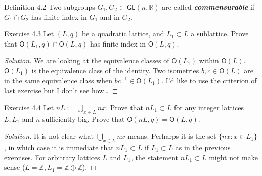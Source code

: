 \begin{idea7}{Definition 4.2}\leavevmode
	Two subgroups $G_1,G_2\subset \mathsf{GL}(n,\mathbb{R})$ are called \textit{\textbf{commensurable}} if $G_1\cap G_2$ has finite index in $G_1$ and in $G_2$.
\end{idea7}


\begin{idea8}{Exercise 4.3}\leavevmode
	Let $(L,q)$ be a quadratic lattice, and $L_1\subset L$ a sublattice. Prove that $\mathsf{O}(L_1,q) \cap \mathsf{O}(L,q)$ has finite index in $\mathsf{O}(L,q)$.
\end{idea8}

\begin{proof}[Solution]


	We are looking at the equivalence classes of $\mathsf{O}(L_1)$ within $\mathsf{O}(L)$. $\mathsf{O}(L_1)$ is the equivalence class of the identity. Two isometries $b,c\in\mathsf{O}(L)$ are in the same equivalence class when $bc^{-1} \in\mathsf{O}(L_1)$. {\color{2}I'd like to use the criterion of last exercise but I don't see how…}
\end{proof}

\begin{idea4}{Exercise 4.4}\leavevmode
Let $nL:=\bigcup_{x\in L} nx$. Prove that $nL_1\subset L$ for any integer lattices $L,L_1$ and $n$ sufficiently big. Prove that $\mathsf{O}(nL,q) =\mathsf{O}(L,q)$.
\end{idea4}

\begin{proof}[Solution]\leavevmode
It is not clear what $\bigcup_{x\in L} nx$ means. Perharps it is the set $\{nx:x\in L_1\}$, in which case it is immediate that $nL_1\subset L$ if $L_1\subset L$ as in the previous exercises. For arbitrary lattices $L$ and $L_1$, the statement $nL_1\subset L$ might not make sense ($L=\mathbb{Z}, L_1=\mathbb{Z}\oplus \mathbb{Z}$).
\end{proof}








